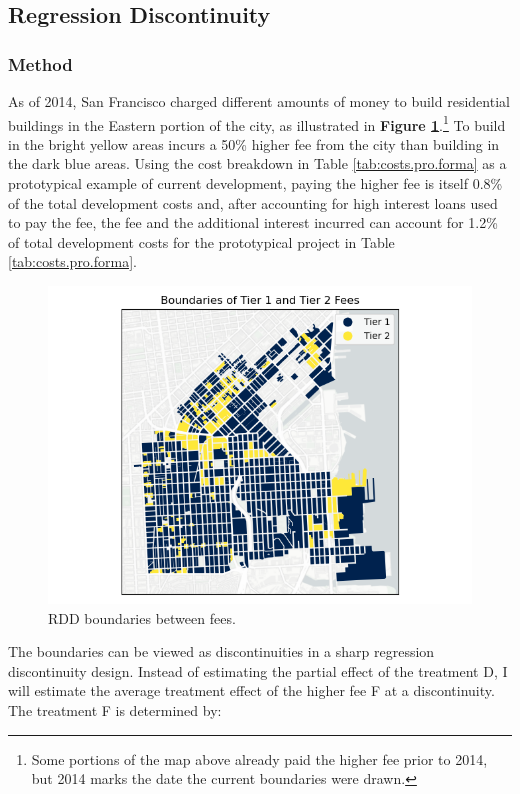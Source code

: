 \documentclass[a4paper,12pt]{article}
\begin{document}
\subsection{Regression Discontinuity}

\subsubsection{Method}
As of 2014, San Francisco charged different amounts of money to build residential buildings in the Eastern portion of the city, as illustrated in \textbf{Figure \ref{fig:tier1_tier2_boundaries}}.\footnote{Some portions of the map above already paid the higher fee prior to 2014, but 2014 marks the date the current boundaries were drawn.} To build in the bright yellow areas incurs a 50\% higher fee from the city than building in the dark blue areas. Using the cost breakdown in Table \ref{tab:costs.pro.forma} as a prototypical example of current development, paying the higher fee is itself 0.8\% of the total development costs and, after accounting for high interest loans used to pay the fee, the fee and the additional interest incurred can account for 1.2\% of total development costs for the prototypical project in Table \ref{tab:costs.pro.forma}.\cite{phillips2021reducing}

\begin{figure}[hbt]
    \includegraphics[scale=.8]{rdd/tier1_tier2_boundaries.png}
    \caption{RDD boundaries between fees.}
    \label{fig:tier1_tier2_boundaries}
\end{figure}

The boundaries can be viewed as discontinuities in a sharp regression discontinuity design. Instead of estimating the partial effect of the treatment D, I will estimate the average treatment effect of the higher fee F at a discontinuity. The treatment F is determined by:
\end{document}
